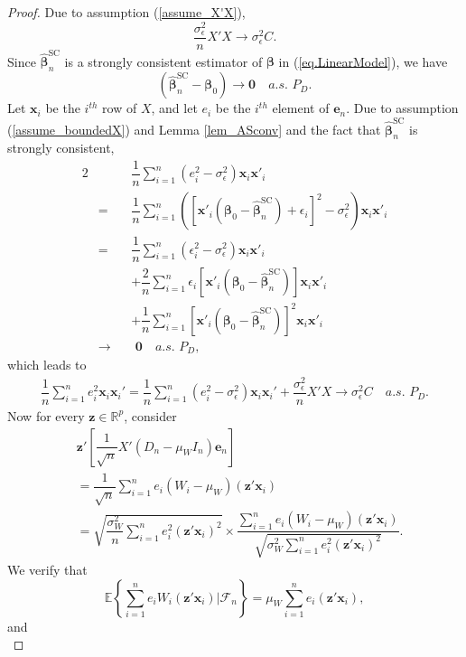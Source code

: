 \documentclass[ejs,authoryear,linksfromyear]{imsart}
\newcommand{\sumin}{\sum_{i=1}^n} %
\newcommand{\bSC}{\widehat{\bm{\beta}}_n^{\text{SC}}} %
\numberwithin{equation}{section}
\theoremstyle{plain}
\begin{document}
\begin{proof}
	Due to assumption (\ref{assume_X'X}), 
	$$
	\dfrac{\sigma^2_\epsilon}{n} X'X 
	\to \sigma^2_\epsilon C.
	$$
	Since $\bSC$ is a strongly consistent estimator of $\bm{\beta}$ in (\ref{eq.LinearModel}), we have
	$$
	\left(
	\bSC - \bm{\beta}_0 
	\right)
	\to \bm{0} \quad a.s. \,\, P_D.  
	$$
	Let $\bm{x}_i$ be the $i^{th}$ row of $X$, and let $e_i$ be the $i^{th}$ element of $\bm{e}_n$. Due to assumption (\ref{assume_boundedX}) and Lemma \ref{lem_ASconv} and the fact that $\bSC$ is strongly consistent, 
	\begin{alignat*}{2}
	& &&\dfrac{1}{n} \sumin (e_i^2 - \sigma^2_{\epsilon}) \bm{x}_i \bm{x}'_i \\
	&= &&\dfrac{1}{n} \sumin
	\left(
	\left[
	\bm{x}'_i 
	\left( \bm{\beta}_0 - \bSC \right)
	+ \epsilon_i
	\right]^2
	- \sigma^2_{\epsilon}
	\right)
	\bm{x}_i \bm{x}'_i \\
	&= &&\dfrac{1}{n} \sumin (\epsilon_i^2 - \sigma^2_{\epsilon}) \bm{x}_i \bm{x}'_i \\
	& &&+ \dfrac{2}{n} \sumin \epsilon_i 
	\left[ \bm{x}'_i \left( \bm{\beta}_0 - \bSC \right) \right] 
	\bm{x}_i \bm{x}'_i \\
	& &&+ \dfrac{1}{n} \sumin
	\left[ \bm{x}'_i \left( \bm{\beta}_0 - \bSC \right) \right]^2 
	\bm{x}_i \bm{x}'_i \\ 
	&\to &&\,\, \bm{0} \quad a.s. \,\, P_D, 
	\end{alignat*}
	which leads to
	\begin{align} \label{eq:X'diag(e)X}
	\dfrac{1}{n} \sumin e_i^2 \bm{x}_i \bm{x}_i' 
	= \dfrac{1}{n} \sumin (e_i^2 - \sigma^2_{\epsilon}) \bm{x}_i \bm{x}_i' 
	+ \dfrac{\sigma^2_{\epsilon} }{n} X'X
	\to \sigma^2_{\epsilon} C 
	\quad a.s. \,\, P_D. 
	\end{align}
	Now for every $\bm{z} \in \mathbb{R}^p$, consider
	\begin{align*}
	&\bm{z}' \left[
		\dfrac{1}{\sqrt{n}} X' (D_n - \mu_W I_n) \bm{e}_n
	\right] \\ 
	&= \dfrac{1}{\sqrt{n}} \sumin 
		e_i (W_i - \mu_W) (\bm{z}' \bm{x}_i) \\
	&= \sqrt{ \dfrac{\sigma^2_W}{n} \sumin e_i^2 (\bm{z}' \bm{x}_i)^2 }
	\times \dfrac{ \sumin e_i (W_i - \mu_W) (\bm{z}' \bm{x}_i) }
	{ \sqrt{ \sigma^2_W \sumin e_i^2 (\bm{z}' \bm{x}_i)^2 } }.
	\end{align*}
	We verify that 
	$$
	\mathbb{E} \left\{
		\sumin e_i W_i (\bm{z}' \bm{x}_i)
		\bigg| \mathcal{F}_n 
	\right\}
	= \mu_W \sumin e_i  (\bm{z}' \bm{x}_i),
	$$
	and
	$$
$$
\end{proof}
\end{document}
